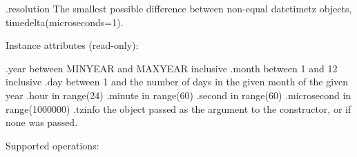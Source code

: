     .resolution
        The smallest possible difference between non-equal datetimetz
        objects, timedelta(microseconds=1).

Instance attributes (read-only):

    .year           between MINYEAR and MAXYEAR inclusive
    .month          between 1 and 12 inclusive
    .day            between 1 and the number of days in the given month
                    of the given year
    .hour           in range(24)
    .minute         in range(60)
    .second         in range(60)
    .microsecond    in range(1000000)
    .tzinfo         the object passed as the  argument to
                    the  constructor, or 
                    if none was passed.

Supported operations:

